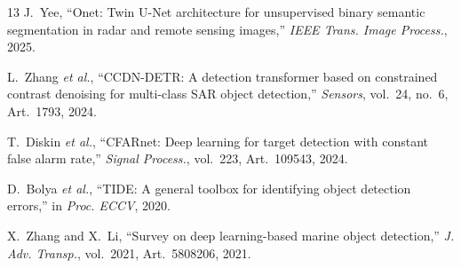 \documentclass[conference]{IEEEtran}
\begin{document}
\begin{thebibliography}{13}
 J.~Yee, ``Onet: Twin U-Net architecture for unsupervised binary semantic segmentation in radar and remote sensing images,'' \textit{IEEE Trans. Image Process.}, 2025.

 L.~Zhang \textit{et al.}, ``CCDN-DETR: A detection transformer based on constrained contrast denoising for multi-class SAR object detection,'' \textit{Sensors}, vol.~24, no.~6, Art.~1793, 2024.

 T.~Diskin \textit{et al.}, ``CFARnet: Deep learning for target detection with constant false alarm rate,'' \textit{Signal Process.}, vol.~223, Art.~109543, 2024.

 D.~Bolya \textit{et al.}, ``TIDE: A general toolbox for identifying object detection errors,'' in \textit{Proc. ECCV}, 2020.

 X.~Zhang and X.~Li, ``Survey on deep learning-based marine object detection,'' \textit{J. Adv. Transp.}, vol.~2021, Art.~5808206, 2021.

\end{thebibliography}
\end{document}
